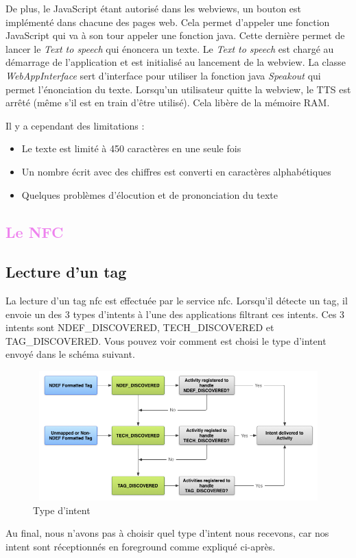 \documentclass[a4paper,11pt]{article}
\begin{document}
		De plus, le JavaScript étant autorisé dans les webviews, un bouton est implémenté dans chacune des pages web. Cela permet d'appeler une fonction JavaScript qui va à son tour appeler une fonction java. Cette dernière permet de lancer le \emph{Text to speech} qui énoncera un texte.
		Le \emph{Text to speech} est chargé au démarrage de l’application et est initialisé au lancement de la webview. La classe \emph{WebAppInterface} sert d'interface pour utiliser la fonction java \emph{Speakout} qui permet l'énonciation du texte. Lorsqu'un utilisateur quitte la webview, le TTS est arrêté (même s'il est en train d'être utilisé). Cela libère de la mémoire RAM.
		
		Il y a cependant des limitations :
		\begin{itemize}
		\item Le texte est limité à 450 caractères en une seule fois
		\item Un nombre écrit avec des chiffres est converti en caractères alphabétiques
		\item Quelques problèmes d'élocution et de prononciation du texte
		 
		\end{itemize}
\newpage
    \textcolor{Violet}{\section{Le NFC}}
      \textcolor{NavyBlue}{\subsection{Lecture d’un tag}}
      La lecture d’un tag nfc est effectuée par le service nfc. Lorsqu’il détecte un tag, il envoie un des 3 types d’intents à l'une des applications 
      filtrant ces intents. Ces 3 intents sont NDEF\_DISCOVERED, TECH\_DISCOVERED et TAG\_DISCOVERED. 
      Vous pouvez voir comment est choisi le type d’intent envoyé dans le schéma suivant.
    \begin{figure}[H]
     \begin{center}
      \includegraphics[width=14cm,height=5cm]{nfc_tag_dispatch.png}
      \caption{Type d'intent}
     \end{center}
    \end{figure}
      Au final, nous n’avons pas à choisir quel type d’intent nous recevons, car nos intent sont réceptionnés en foreground comme expliqué ci-après.
      
\end{document}
